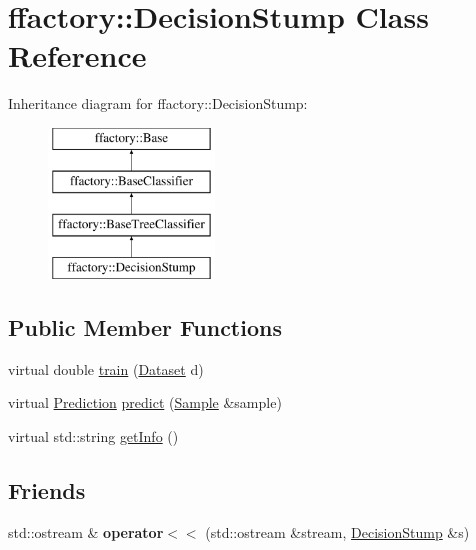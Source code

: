 \hypertarget{classffactory_1_1_decision_stump}{\section{ffactory\-:\-:Decision\-Stump Class Reference}
\label{classffactory_1_1_decision_stump}
}
Inheritance diagram for ffactory\-:\-:Decision\-Stump\-:\begin{figure}[H]
\begin{center}
\leavevmode
\includegraphics[height=4.000000cm]{classffactory_1_1_decision_stump}
\end{center}
\end{figure}
\subsection*{Public Member Functions}
\begin{DoxyCompactItemize}
\item 
virtual double \hyperlink{classffactory_1_1_decision_stump_ad8ad08ac61f113ca160f01e1e5f9e0f0}{train} (\hyperlink{classffactory_1_1_dataset}{Dataset} d)
\item 
virtual \hyperlink{classffactory_1_1_prediction}{Prediction} \hyperlink{classffactory_1_1_decision_stump_a503571ad46097bec7453e6657c940f2f}{predict} (\hyperlink{classffactory_1_1_sample}{Sample} \&sample)
\item 
virtual std\-::string \hyperlink{classffactory_1_1_decision_stump_af2c5492cfe13d297b11a7aa491695998}{get\-Info} ()
\end{DoxyCompactItemize}
\subsection*{Friends}
\begin{DoxyCompactItemize}
\item 
\hypertarget{classffactory_1_1_decision_stump_abdea50b825108d8d99410d7edc240024}{std\-::ostream \& {\bfseries operator$<$$<$} (std\-::ostream \&stream, \hyperlink{classffactory_1_1_decision_stump}{Decision\-Stump} \&s)}\label{classffactory_1_1_decision_stump_abdea50b825108d8d99410d7edc240024}

\end{DoxyCompactItemize}
